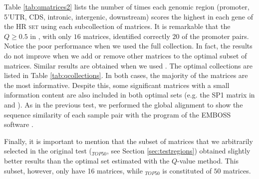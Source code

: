 Table \ref{tab:qmatrices2} lists the number of times each genomic region (promoter, 5'UTR, CDS,
intronic, intergenic, downstream) scores the highest in each gene of the \textsc{HR set} using
each subcollection of matrices. It is remarkable that the $Q \geq 0.5$ in , with only 
$16$ matrices, identified correctly $20$ of the promoter pairs. Notice the poor performance
when we used the full  collection. In fact, the results do not improve when we add or 
remove other matrices to the optimal subset of matrices. Similar results are obtained when
we used . The optimal collections are listed in Table \ref{tab:qcollections}. In
both cases, the majority of the matrices are the most informative. Despite this, some 
significant matrices with a small information content are also included in both optimal sets
(e.g. the SP1 matrix in  and ). As in the previous test, we performed
the global alignment to show the sequence similarity of each sample pair
with the program  of the EMBOSS software \citep{olson:2002a}.

Finally, it is important to mention that the subset of matrices that we arbitrarily
selected in the original test ($_{TOP50}$, see Section \ref{sec:testregions}) 
obtained slightly better results than the optimal set estimated with the $Q$-value method.
This subset, however, only have 16 matrices, while $_{TOP50}$ is constituted of
$50$ matrices.

